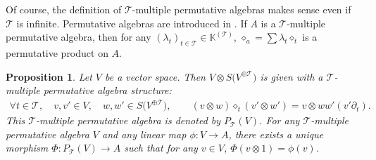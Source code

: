 \documentclass[pdftex]{sigma}
\numberwithin{equation}{section}
\newtheorem{Proposition}[Theorem]{Proposition}
 { \theoremstyle{definition}
\newtheorem{Definition}[Theorem]{Definition}
\newtheorem{Note}[Theorem]{Note}
\newtheorem{Example}[Theorem]{Example}
\newtheorem{Remark}[Theorem]{Remark}
\newtheorem{Notation}[Theorem]{Notation}}
\newcommand{\K}{\mathbb{K}}
\newcommand{\T}{\mathcal{T}}
\begin{document}
Of course, the definition of $\T$-multiple permutative algebras makes sense even if $\T$ is infinite.
Permutative algebras are introduced in \cite{Chapoton}. If $A$ is a $\T$-multiple permutative algebra,
then for any $(\lambda_t)_{t\in \T}\in \K^{(\T)}$, $\diamond_a=\sum \lambda_t\diamond_t$ is a permutative product on $A$.

\begin{Proposition} \label{prop13}
Let $V$ be a vector space. Then $V\otimes S\big(V^{\oplus\T}\big)$ is given with a $\T$-multiple permutative algebra structure:
\begin{gather*}
\forall t\in \T,\quad v,v'\in V,\quad w,w'\in S\big(V^{\oplus\T}\big),\qquad
(v\otimes w)\diamond_t (v'\otimes w')=v \otimes ww' (v'\partial_t).
\end{gather*}
This $\T$-multiple permutative algebra is denoted by $P_\T(V)$.
For any $\T$-multiple permutative algebra $V$ and any linear map $\phi\colon V\longrightarrow A$,
there exists a unique morphism $\Phi\colon P_\T(V)\longrightarrow A$ such that for any $v\in V$, $\Phi(v\otimes 1)=\phi(v)$.
\end{Proposition}
\end{document}

